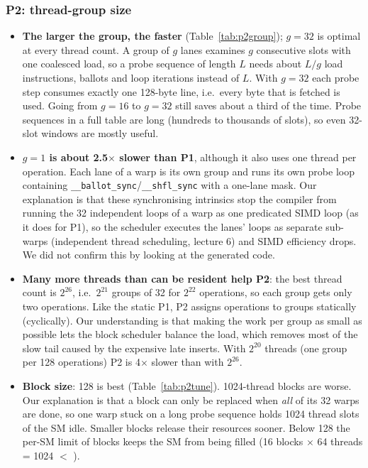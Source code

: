 \subsubsection*{P2: thread-group size}

\begin{itemize}
\item \textbf{The larger the group, the faster} (Table~\ref{tab:p2group}); $g=32$ is
  optimal at every thread count. A group of $g$ lanes examines $g$ consecutive
  slots with one coalesced load, so a probe sequence of length $L$ needs about $L/g$
  load instructions, ballots and loop iterations instead of $L$. With $g=32$ each
  probe step consumes exactly one 128-byte line, i.e.\ every byte that is
  fetched is used. Going from $g=16$ to $g=32$ still saves about a third of the time. Probe
  sequences in a full table are long (hundreds to thousands of slots), so
  even 32-slot windows are mostly useful.
\item \textbf{$g=1$ is about 2.5$\times$ slower than P1}, although it also uses one
  thread per operation. Each lane of a warp is its own group and runs its own probe loop
  containing \texttt{\_\_ballot\_sync}/\texttt{\_\_shfl\_sync} with a one-lane mask. Our
  explanation is that these synchronising intrinsics stop the compiler from running the
  32 independent loops of a warp as one predicated SIMD loop (as it does for P1), so
  the scheduler executes the lanes' loops as separate sub-warps (independent
  thread scheduling, lecture 6) and SIMD efficiency drops. We did not confirm this by looking at the generated code.
\item \textbf{Many more threads than can be resident help P2}: the best thread
  count is $2^{26}$, i.e.\ $2^{21}$ groups of 32 for $2^{22}$ operations, so each group
  gets only two operations. Like the static P1, P2 assigns operations to
  groups statically (cyclically). Our understanding is that making the work per group as
  small as possible lets the block scheduler balance the load, which removes most of
  the slow tail caused by the expensive late inserts. With $2^{20}$ threads (one group per 128 operations) P2
  is 4$\times$ slower than with $2^{26}$.
\item \textbf{Block size}: 128 is best (Table~\ref{tab:p2tune}). 1024-thread blocks
  are worse. Our explanation is that a block can only be replaced when \emph{all} of its 32 warps are
  done, so one warp stuck on a long probe sequence holds 1024 thread slots of the
  SM idle. Smaller blocks release their resources sooner. Below 128 the per-SM
  limit of \devmaxblockspersm{} blocks keeps the SM from being filled (16 blocks
  $\times$ 64 threads = 1024 $<$ \devmaxthreadspersm).
\end{itemize}

